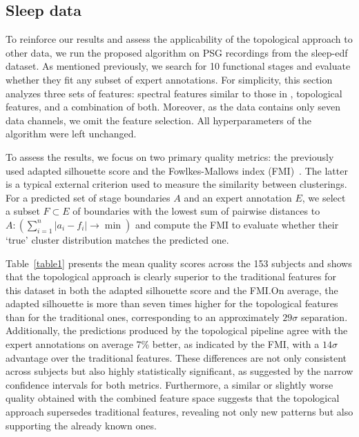 \documentclass[pdflatex,sn-basic,Numbered]{sn-jnl}
\begin{document}
\subsection{Sleep data}

To reinforce our results and assess the applicability of the topological approach to other data, we run the proposed algorithm on PSG recordings from the sleep-edf~\cite{SleepEdf,PhysioNet} dataset. As mentioned previously, we search for 10 functional stages and evaluate whether they fit any subset of expert annotations. For simplicity, this section analyzes three sets of features: spectral features similar to those in \cite{SDA}, topological features, and a combination of both. Moreover, as the data contains only seven data channels, we omit the feature selection. All hyperparameters of the algorithm were left unchanged.

To assess the results, we focus on two primary quality metrics: the previously used adapted silhouette score and the Fowlkes-Mallows index (FMI)~\cite{Fowlkes01091983}. The latter is a typical external criterion used to measure the similarity between clusterings. For a predicted set of stage boundaries $A$ and an expert annotation $E$, we select a subset $F \subset E$ of boundaries with the lowest sum of pairwise distances to $A: \left( \sum_{i = 1}^{n} |a_i - f_i| \rightarrow \min \right)$ and compute the FMI to evaluate whether their `true' cluster distribution matches the predicted one.

Table~\ref{table1} presents the mean quality scores across the 153 subjects and shows that the topological approach is clearly superior to the traditional features for this dataset in both the adapted silhouette score and the FMI.\@ On average, the adapted silhouette is more than seven times higher for the topological features than for the traditional ones, corresponding to an approximately $29\sigma$ separation. Additionally, the predictions produced by the topological pipeline agree with the expert annotations on average 7\% better, as indicated by the FMI, with a $14\sigma$ advantage over the traditional features. These differences are not only consistent across subjects but also highly statistically significant, as suggested by the narrow confidence intervals for both metrics. Furthermore, a similar or slightly worse quality obtained with the combined feature space suggests that the topological approach supersedes traditional features, revealing not only new patterns but also supporting the already known ones.
\end{document}
